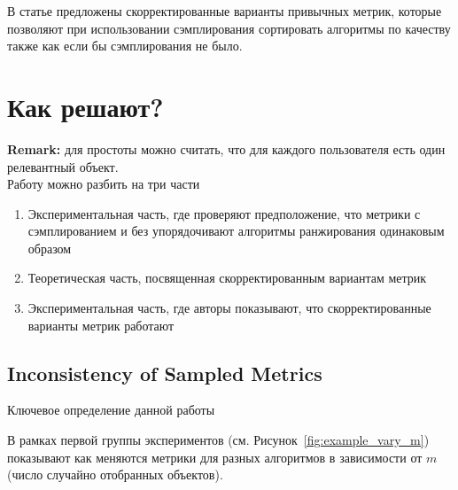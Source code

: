 В статье предложены скорректированные варианты привычных метрик, которые позволяют при использовании сэмплирования сортировать алгоритмы по качеству также как если бы сэмплирования не было. 

\section{Как решают?}

\textbf{Remark:} для простоты можно считать, что для каждого пользователя есть один релевантный объект. \\

Работу можно разбить на три части
\begin{enumerate}
    \item Экспериментальная часть, где проверяют предположение, что метрики с сэмплированием и без упорядочивают алгоритмы ранжирования одинаковым образом
    \item Теоретическая часть, посвященная скорректированным вариантам метрик
    \item Экспериментальная часть, где авторы показывают, что скорректированные варианты метрик работают
\end{enumerate}

\subsection{Inconsistency of Sampled Metrics}

Ключевое определение данной работы


В рамках первой группы экспериментов (см. Рисунок~\ref{fig:example_vary_m}) показывают как меняются метрики для разных алгоритмов в зависимости от $m$ (число случайно отобранных объектов). \\

